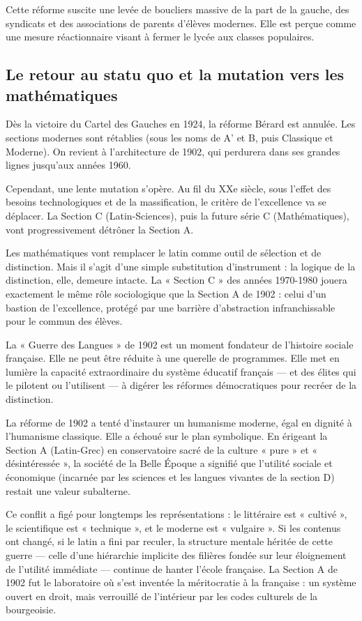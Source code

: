 Cette réforme suscite une levée de boucliers massive de la part de la gauche, des syndicats et des
associations de parents d'élèves modernes. Elle est perçue comme une mesure réactionnaire visant à
fermer le lycée aux classes populaires.



\subsection{Le retour au statu quo et la mutation vers les mathématiques}

Dès la victoire du Cartel des Gauches en 1924, la réforme Bérard est annulée. Les sections modernes
sont rétablies (sous les noms de A' et B, puis Classique et Moderne).\cite{I-2-1-ref7} On revient à
l'architecture de 1902, qui perdurera dans ses grandes lignes jusqu'aux années 1960.

Cependant, une lente mutation s'opère. Au fil du XXe siècle, sous l'effet des besoins technologiques
et de la massification, le critère de l'excellence va se déplacer. La Section C (Latin-Sciences),
puis la future série C (Mathématiques), vont progressivement détrôner la Section A.

Les mathématiques vont remplacer le latin comme outil de sélection et de
distinction.\cite{I-2-1-ref4} Mais il s'agit d'une simple substitution d'instrument : la logique de
la distinction, elle, demeure intacte. La « Section C » des années 1970-1980 jouera exactement le
même rôle sociologique que la Section A de 1902 : celui d'un bastion de l'excellence, protégé par
une barrière d'abstraction infranchissable pour le commun des élèves.

La « Guerre des Langues » de 1902 est un moment fondateur de l'histoire sociale française. Elle ne
peut être réduite à une querelle de programmes. Elle met en lumière la capacité extraordinaire du
système éducatif français — et des élites qui le pilotent ou l'utilisent — à digérer les réformes
démocratiques pour recréer de la distinction.

La réforme de 1902 a tenté d'instaurer un humanisme moderne, égal en dignité à l'humanisme
classique. Elle a échoué sur le plan symbolique. En érigeant la Section A (Latin-Grec) en
conservatoire sacré de la culture « pure » et « désintéressée », la société de la Belle Époque a
signifié que l'utilité sociale et économique (incarnée par les sciences et les langues vivantes de
la section D) restait une valeur subalterne.

Ce conflit a figé pour longtemps les représentations : le littéraire est « cultivé », le
scientifique est « technique », et le moderne est « vulgaire ». Si les contenus ont changé, si le
latin a fini par reculer, la structure mentale héritée de cette guerre — celle d'une hiérarchie
implicite des filières fondée sur leur éloignement de l'utilité immédiate — continue de hanter
l'école française. La Section A de 1902 fut le laboratoire où s'est inventée la méritocratie à la
française : un système ouvert en droit, mais verrouillé de l'intérieur par les codes culturels de la
bourgeoisie.

